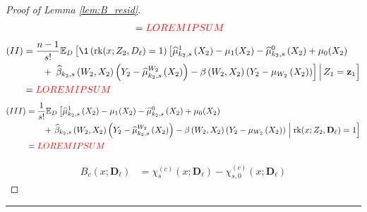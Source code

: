 \begin{proof}[Proof of Lemma \ref{lem:B_resid}]
\begin{equation}
\begin{aligned}
            & = {\color{red} LOREM IPSUM}
        \end{aligned}
    \end{equation}
        \begin{equation}
        \begin{aligned}
            (II) & =  \frac{n-1}{s!} \E_{D}\left[\1\left(\rk(x; Z_{2}, D_{\ell}) = 1\right)
            \left[\hat{\mu}_{k_2,s}^{1}\left(X_{2}\right) - \mu_{1}(X_{2})
            - \hat{\mu}_{k_2,s}^{0}\left(X_{2}\right) + \mu_{0}(X_{2}) \right. \right.\\
            & \quad \quad + \left. \left. 
            \hat{\beta}_{k_2,s}\left(W_{2}, X_{2}\right)\left(Y_{2} - \hat{\mu}^{W_{2}}_{k_2,s}\left(X_{2}\right)\right)
            - \beta\left(W_{2}, X_{2}\right)\left(Y_{2} - \mu_{W_{2}}\left(X_{2}\right)\right)\right]
            \, \middle| \, Z_1 = \mathbf{z}_1\right]\\
            & = {\color{red} LOREM IPSUM}
        \end{aligned}
    \end{equation}
        \begin{equation}
        \begin{aligned}
            (III) & = \frac{1}{s!} \mathbb{E}_{D}\left[\widehat{\mu}_{k_2,s}^{1}\left(X_{2}\right) - \mu_{1}(X_{2})
            - \widehat{\mu}_{k_2,s}^{0}\left(X_{2}\right) + \mu_{0}(X_{2}) \right. \\
            & \quad \quad + \left. 
            \widehat{\beta}_{k_2,s}\left(W_{2}, X_{2}\right)\left(Y_{2} - \widehat{\mu}^{W_{2}}_{k_2,s}\left(X_{2}\right)\right)
            - \beta\left(W_{2}, X_{2}\right)\left(Y_{2} - \mu_{W_{2}}\left(X_{2}\right)\right)\; \middle| \; \operatorname{rk}(x; Z_2, \mathbf{D}_{\ell}) = 1\right] \\
            & = {\color{red} LOREM IPSUM}
        \end{aligned}
    \end{equation}
    
    \begin{equation}
        \begin{aligned}
            B_{c}\left(x; \mathbf{D}_{\ell}\right)
            & = \chi_{s}^{(c)}\left(x; \mathbf{D}_{\ell}\right) - \chi_{s,0}^{(c)}\left(x; \mathbf{D}_{\ell}\right)
        \end{aligned}
    \end{equation}
\end{proof}

\hrule

